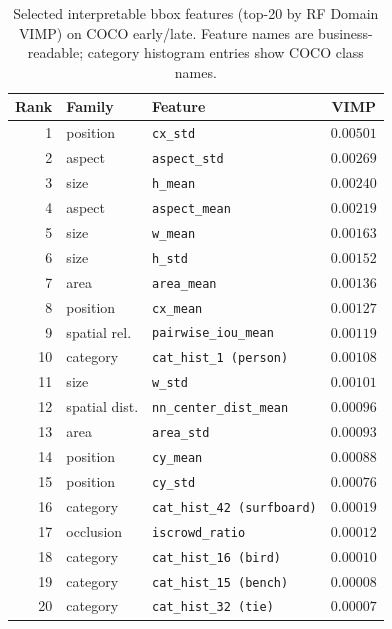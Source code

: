 \begin{table}[ht]
\centering
\caption{Selected interpretable bbox features (top-20 by RF Domain VIMP) on COCO early/late. Feature names are business-readable; category histogram entries show COCO class names.}
\label{tab:bbox-selected-features-final}
\small
\begin{tabular}{@{}r l l c@{}}
\toprule
Rank & Family & Feature & VIMP \\
\midrule
1 & position & \texttt{cx\_std} & $0.00501$ \\
2 & aspect & \texttt{aspect\_std} & $0.00269$ \\
3 & size & \texttt{h\_mean} & $0.00240$ \\
4 & aspect & \texttt{aspect\_mean} & $0.00219$ \\
5 & size & \texttt{w\_mean} & $0.00163$ \\
6 & size & \texttt{h\_std} & $0.00152$ \\
7 & area & \texttt{area\_mean} & $0.00136$ \\
8 & position & \texttt{cx\_mean} & $0.00127$ \\
9 & spatial rel. & \texttt{pairwise\_iou\_mean} & $0.00119$ \\
10 & category & \texttt{cat\_hist\_1 (person)} & $0.00108$ \\
11 & size & \texttt{w\_std} & $0.00101$ \\
12 & spatial dist. & \texttt{nn\_center\_dist\_mean} & $0.00096$ \\
13 & area & \texttt{area\_std} & $0.00093$ \\
14 & position & \texttt{cy\_mean} & $0.00088$ \\
15 & position & \texttt{cy\_std} & $0.00076$ \\
16 & category & \texttt{cat\_hist\_42 (surfboard)} & $0.00019$ \\
17 & occlusion & \texttt{iscrowd\_ratio} & $0.00012$ \\
18 & category & \texttt{cat\_hist\_16 (bird)} & $0.00010$ \\
19 & category & \texttt{cat\_hist\_15 (bench)} & $0.00008$ \\
20 & category & \texttt{cat\_hist\_32 (tie)} & $0.00007$ \\
\bottomrule
\end{tabular}
\end{table}

